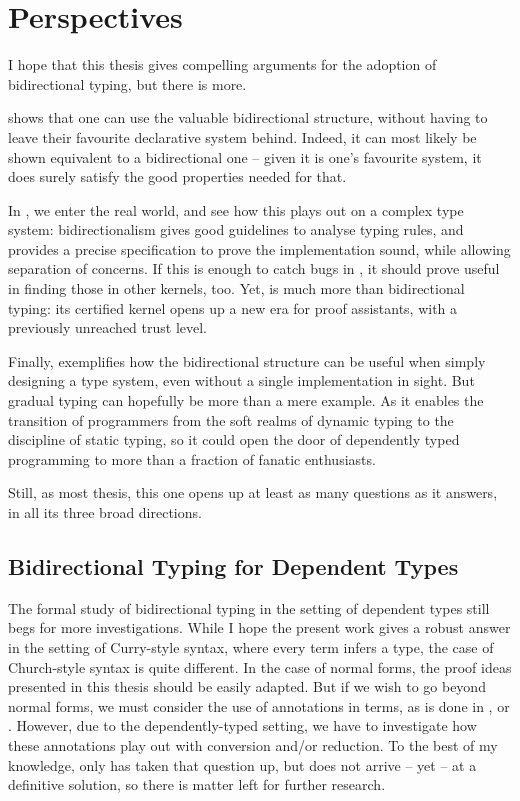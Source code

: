 \chapter{Perspectives}%
\label{chap:future-work}

I hope that this thesis gives compelling arguments for the adoption of bidirectional typing,
but there is more.

 shows that one can use the valuable bidirectional structure,
without having to  leave their favourite declarative
system behind. Indeed, it can most likely  be shown equivalent to a bidirectional one
– given it is one’s favourite system, it does surely satisfy the good properties
needed for that.

In , we enter the real world, and see how this plays out
on a complex type system: bidirectionalism gives good guidelines to analyse
typing rules, and provides a precise specification to prove the implementation sound,
while allowing separation of concerns. If this is enough
to catch bugs in , it should prove useful in finding those in other kernels, too.
Yet,  is much more than bidirectional typing: its certified kernel opens
up a new era for proof assistants, with a previously unreached trust level.

Finally,
 exemplifies how the bidirectional structure can be useful when
simply designing a type system, even without a single implementation in sight.
But gradual typing can hopefully be more than a mere
example. As it enables the transition of programmers from the soft realms of
dynamic typing to the discipline of static typing, so it could open the door of
dependently typed programming to more than a fraction of fanatic enthusiasts.

Still, as most thesis, this one opens up at least as many questions as it answers,
in all its three broad directions.

\section{Bidirectional Typing for Dependent Types}

The formal study of bidirectional typing in the setting of dependent types still begs for
more investigations. While I hope the present work gives a robust answer in the setting
of Curry-style syntax, where every term infers a type,
the case of Church-style syntax is quite different. In the case of normal forms,
the proof ideas presented in this thesis should be easily adapted.
But if we wish to go beyond normal forms, we must consider the use of annotations in terms,
as is done in \eg{} ,  or
.
However, due to the dependently-typed
setting, we have to investigate how these annotations play out with conversion and/or reduction.
To the best of my knowledge, only \citeauthor{McBride2022} has taken that question up,
but does not arrive – yet – at a definitive solution, so there is
matter left for further research.

